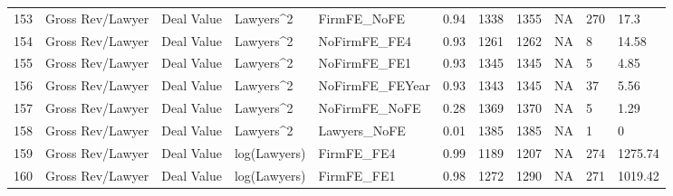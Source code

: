 \documentclass{article}
\begin{document}
\begin{table}[H]
\begin{tabular}{rllllllllll}
  153 & Gross Rev/Lawyer & Deal Value & Lawyers^2 & FirmFE\_NoFE & 0.94 & 1338 & 1355 & NA & 270 & 17.3 \\ 
  154 & Gross Rev/Lawyer & Deal Value & Lawyers^2 & NoFirmFE\_FE4 & 0.93 & 1261 & 1262 & NA & 8 & 14.58 \\ 
  155 & Gross Rev/Lawyer & Deal Value & Lawyers^2 & NoFirmFE\_FE1 & 0.93 & 1345 & 1345 & NA & 5 & 4.85 \\ 
  156 & Gross Rev/Lawyer & Deal Value & Lawyers^2 & NoFirmFE\_FEYear & 0.93 & 1343 & 1345 & NA & 37 & 5.56 \\ 
  157 & Gross Rev/Lawyer & Deal Value & Lawyers^2 & NoFirmFE\_NoFE & 0.28 & 1369 & 1370 & NA & 5 & 1.29 \\ 
  158 & Gross Rev/Lawyer & Deal Value & Lawyers^2 & Lawyers\_NoFE & 0.01 & 1385 & 1385 & NA & 1 & 0 \\ 
  159 & Gross Rev/Lawyer & Deal Value & log(Lawyers) & FirmFE\_FE4 & 0.99 & 1189 & 1207 & NA & 274 & 1275.74 \\ 
  160 & Gross Rev/Lawyer & Deal Value & log(Lawyers) & FirmFE\_FE1 & 0.98 & 1272 & 1290 & NA & 271 & 1019.42 \\ 
   \hline
\end{tabular}
\end{table}
\end{document}
